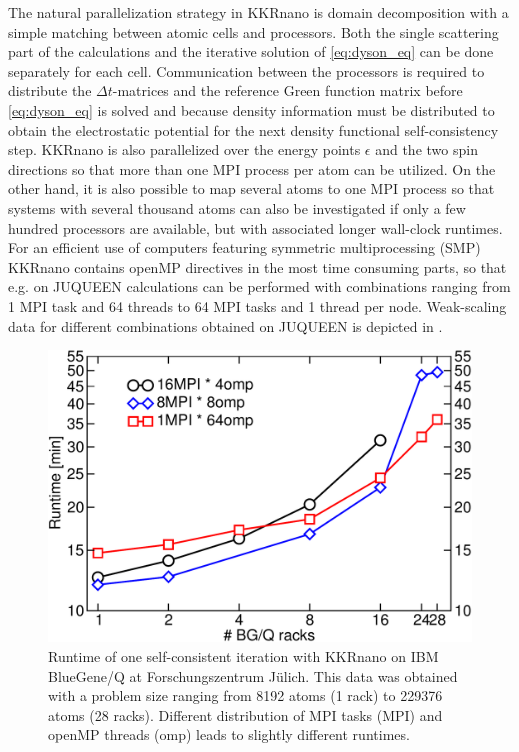 \documentclass [a4paper, 12pt]{article}
\begin{document}
The natural parallelization strategy in KKRnano is domain decomposition with a simple 
matching between atomic cells and processors. Both the single scattering part of the 
calculations and the iterative solution of \cref{eq:dyson_eq} can be done separately for each cell. 
Communication between the processors is required to distribute the
$\Delta t$-matrices and the 
reference Green function matrix
before \cref{eq:dyson_eq} is solved and because density information
must be distributed to obtain the electrostatic potential for the next density functional
self-consistency step. KKRnano is also parallelized over the energy points $\epsilon$ and 
the two spin directions so that more than one MPI process per atom can be utilized.
On the other hand, it is also possible to map several atoms to one MPI process so that
systems with several thousand atoms can also be investigated if only a few hundred
processors are available, but with associated longer wall-clock runtimes.
\\
For an efficient use of computers featuring symmetric multiprocessing (SMP) KKRnano contains openMP directives
in the most time consuming parts, so that e.g. on JUQUEEN calculations can be performed with combinations 
ranging from 1 MPI task and 64 threads to 64 MPI tasks and 1 thread per node. Weak-scaling data
for different combinations
obtained on JUQUEEN is depicted in .
\begin{figure}[h]
\begin{center}
 \includegraphics[scale=0.45]{Figures/total_runtimes.pdf}
\end{center}
\caption{Runtime of one self-consistent iteration with KKRnano 
	on IBM BlueGene/Q at Forschungszentrum J{\"u}lich.
	This data was obtained with a problem size ranging from 8192 atoms (1 rack) to 229376 atoms (28 racks).
	Different distribution of MPI tasks (MPI) and openMP threads (omp) leads to slightly different runtimes.}
\label{fig:total_runtimes}
\end{figure}
\end{document}
